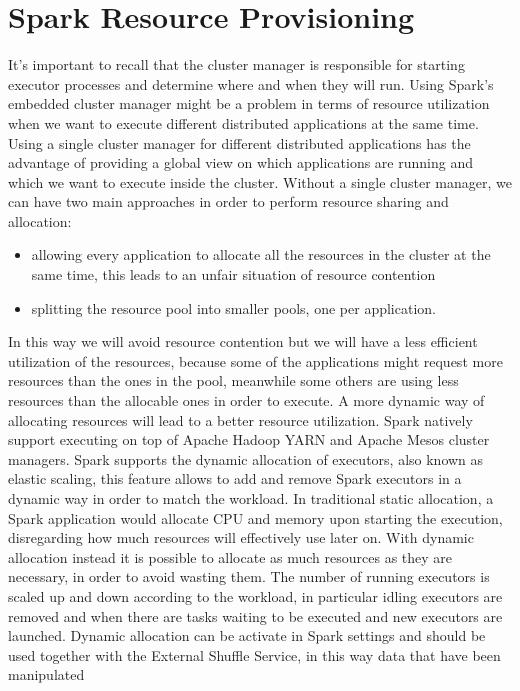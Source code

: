 \section{Spark Resource Provisioning}\label{sec:spark_resource_provisioning}
It's important to recall that the cluster manager is responsible for starting executor processes and determine where and when they will run. Using Spark’s embedded cluster manager might be a problem in terms of resource utilization when we want to execute different distributed applications at the same time. Using a single cluster manager for different distributed applications has the advantage of providing a global view on which applications are running and which we want to execute inside the cluster.
Without a single cluster manager, we can have two main approaches
in order to perform resource sharing and allocation:
\begin{itemize}
	\item  allowing every application to allocate all the resources in the cluster at the same time, this leads to an unfair situation of resource contention
	\item splitting the resource pool into smaller pools, one per application.
\end{itemize}
In this way we will avoid resource contention but we will
have a less efficient utilization of the resources, because some of
the applications might request more resources than the ones in
the pool, meanwhile some others are using less resources than
the allocable ones in order to execute.
A more dynamic way of allocating resources will lead to a better resource
utilization. Spark natively support executing on top of Apache
Hadoop YARN and Apache Mesos cluster managers.
Spark supports the dynamic allocation of executors, also known as
elastic scaling, this feature allows to add and remove Spark executors
in a dynamic way in order to match the workload.
In traditional static allocation, a Spark application would allocate
CPU and memory upon starting the execution, disregarding how
much resources will effectively use later on. With dynamic allocation
instead it is possible to allocate as much resources as they are
necessary, in order to avoid wasting them. The number of running
executors is scaled up and down according to the workload, in particular
idling executors are removed and when there are tasks waiting
to be executed and new executors are launched. Dynamic allocation can 
be activate in Spark settings and should be used together with the
External Shuffle Service, in this way data that have been manipulated
